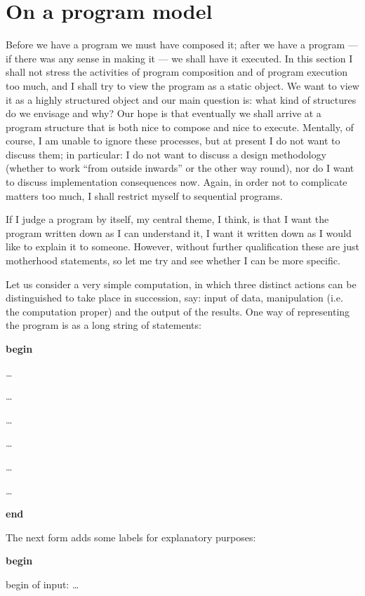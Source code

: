 \section{On a program model}

Before we have a program we must have composed it; after we have a program --- if there was any sense in making it --- we shall have it executed. In this section I shall not stress the activities of program composition and of program execution too much, and I shall try to view the program as a static object. We want to view it as a highly structured object and our main question is: what kind of structures do we envisage and why? Our hope is that eventually we shall arrive at a program structure that is both nice to compose and nice to execute. Mentally, of course, I am unable to ignore these processes, but at present I do not want to discuss them; in particular: I do not want to discuss a design methodology (whether to work ``from outside inwards'' or the other way round), nor do I want to discuss implementation consequences now. Again, in order not to complicate matters too much, I shall restrict myself to sequential programs.

If I judge a program by itself, my central theme, I think, is that I want the program written down as I can understand it, I want it written down as I would like to explain it to someone. However, without further qualification these are just motherhood statements, so let me try and see whether I can be more specific.

Let us consider a very simple computation, in which three distinct actions can be distinguished to take place in succession, say: input of data, manipulation (i.e. the computation proper) and the output of the results. One way of representing the program is as a long string of statements:

\noindent
\textbf{begin}

\noindent
\quad\dots

\noindent
\quad\dots

\noindent
\quad\dots

\noindent
\quad\dots

\noindent
\quad\dots

\noindent
\quad\dots

\noindent
\textbf{end}

The next form adds some labels for explanatory purposes:

\noindent
\tabto{10em}\textbf{begin}
\nopagebreak

\noindent
begin of input:\tabto{10em} \quad\dots
\nopagebreak

